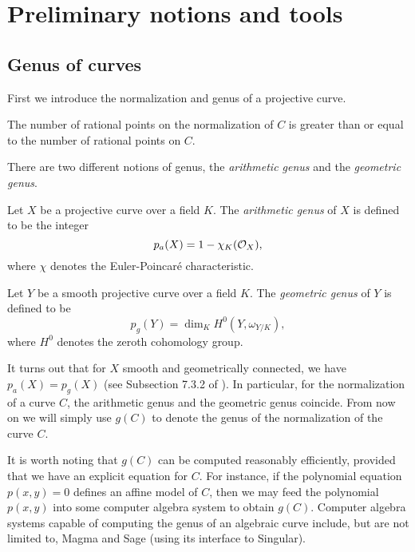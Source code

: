 \section{Preliminary notions and tools}

\subsection{Genus of curves}

First we introduce the normalization and genus of a projective curve.

\begin{definition}
\end{definition}

\begin{remark}
  \label{rem:ratpoint-normalization}
  The number of rational points on the normalization of $C$ is greater
  than or equal to the number of rational points on $C$.
\end{remark}

There are two different notions of genus, the \emph{arithmetic genus}
and the \emph{geometric genus}.

\begin{definition}
  Let $X$ be a projective curve over a field $K$. The \emph{arithmetic
    genus} of $X$ is defined to be the integer
  \[
  p_a(X) = 1 - \chi_K(\mathcal{O}_X),
  \]
  where $\chi$ denotes the Euler-Poincar\'e characteristic.
\end{definition}

\begin{definition}
  Let $Y$ be a smooth projective curve over a field $K$. The
  \emph{geometric genus} of $Y$ is defined to be
  \[
  p_g(Y) = \dim_K H^0(Y, \omega_{Y/K}),
  \]
  where $H^0$ denotes the zeroth cohomology group.
\end{definition}

It turns out that for $X$ smooth and geometrically connected, we have
$p_a(X) = p_g(X)$ (see Subsection 7.3.2 of \cite{MR1917232}). In
particular, for the normalization of a curve $C$, the arithmetic genus
and the geometric genus coincide. From now on we will simply use
$g(C)$ to denote the genus of the normalization of the curve $C$.

\begin{remark}
  It is worth noting that $g(C)$ can be computed reasonably
  efficiently, provided that we have an explicit equation for $C$. For
  instance, if the polynomial equation $p(x, y) = 0$ defines an affine
  model of $C$, then we may feed the polynomial $p(x, y)$ into some
  computer algebra system to obtain $g(C)$. Computer algebra systems
  capable of computing the genus of an algebraic curve include, but
  are not limited to, Magma and Sage (using its interface to
  Singular).
\end{remark}

